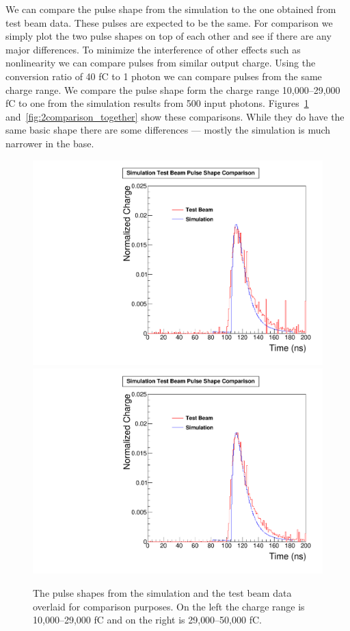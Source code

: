 We can compare the pulse shape from the simulation to the one obtained from test beam data. These pulses are expected to be the same. For comparison we simply plot the two pulse shapes on top of each other and see if there are any major differences. To minimize the interference of other effects such as nonlinearity we can compare pulses from similar output charge. Using the conversion ratio of 40 fC to 1 photon we can compare pulses from the same charge range. We compare the pulse shape form the charge range 10,000--29,000 fC to one from the simulation results from 500 input photons. Figures~\ref{fig:1comparison_together} and~\ref{fig:2comparison_together} show these comparisons. While they do have the same basic shape there are some differences --- mostly the simulation is much narrower in the base.

\begin{figure}
\centering
\includegraphics[width=0.495\linewidth]{Figures/10Comparison.pdf}
\includegraphics[width=0.495\linewidth]{Figures/29Comparison.pdf}
\caption{The pulse shapes from the simulation and the test beam data overlaid for comparison purposes. On the left the charge range is 10,000--29,000 fC and on the right is 29,000--50,000 fC.}
\label{fig:1comparison_together}
\end{figure}

